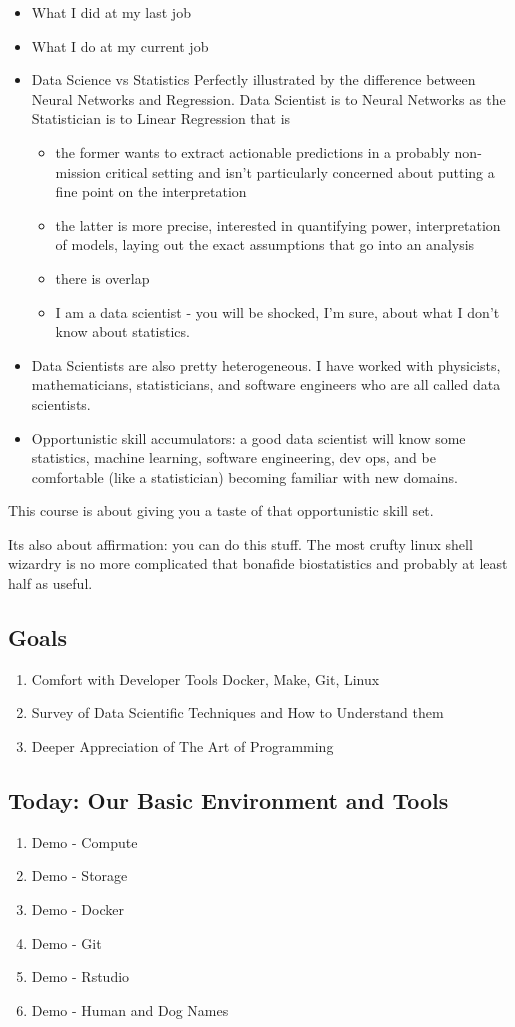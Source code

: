 \documentclass[bigger]{beamer}
\begin{document}
\begin{itemize}
\item What I did at my last job
\item What I do at my current job
\item Data Science vs Statistics Perfectly illustrated by the difference
between Neural Networks and Regression. Data Scientist is to Neural
Networks as the Statistician is to Linear Regression that is
\begin{itemize}
\item the former wants to extract actionable predictions in a probably
non-mission critical setting and isn't particularly concerned
about putting a fine point on the interpretation
\item the latter is more precise, interested in quantifying power,
interpretation of models, laying out the exact assumptions that go
into an analysis
\item there is overlap
\item I am a data scientist - you will be shocked, I'm sure, about what
I don't know about statistics.
\end{itemize}
\item Data Scientists are also pretty heterogeneous. I have worked with
physicists, mathematicians, statisticians, and software engineers
who are all called data scientists.
\item Opportunistic skill accumulators: a good data scientist will know
some statistics, machine learning, software engineering, dev ops,
and be comfortable (like a statistician) becoming familiar with new
domains.
\end{itemize}

This course is about giving you a taste of that opportunistic skill
set.

Its also about affirmation: you can do this stuff. The most crufty
linux shell wizardry is no more complicated that bonafide
biostatistics and probably at least half as useful.

\subsection{Goals}
\label{sec:orge0ff208}

\begin{enumerate}
\item Comfort with Developer Tools
Docker, Make, Git, Linux
\item Survey of Data Scientific Techniques and How to Understand them
\item Deeper Appreciation of The Art of Programming
\end{enumerate}

\subsection{Today: Our Basic Environment and Tools}
\label{sec:org714244e}

\begin{enumerate}
\item Demo - Compute
\item Demo - Storage
\item Demo - Docker
\item Demo - Git
\item Demo - Rstudio

\item Demo - Human and Dog Names
\end{enumerate}
\end{document}
